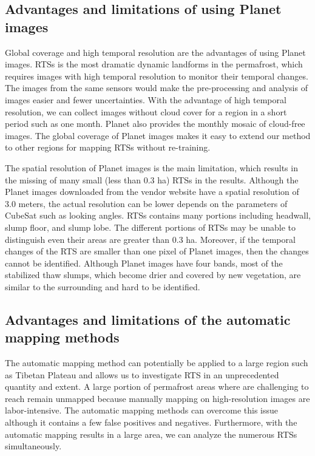 \documentclass[preprint,12pt,authoryear]{elsarticle}
\begin{document}
\subsection{Advantages and limitations of using Planet images}
\label{subsec_advantage_limitation_planet}

Global coverage and high temporal resolution are the advantages of using Planet images. RTSs is the most dramatic dynamic landforms in the permafrost, which requires images with high temporal resolution to monitor their temporal changes. The images from the same sensors would make the pre-processing and analysis of images easier and fewer uncertainties. With the advantage of high temporal resolution, we can collect images without cloud cover for a region in a short period such as one month. Planet also provides the monthly mosaic of cloud-free images. The global coverage of Planet images makes it easy to extend our method to other regions for mapping RTSs without re-training. 

The spatial resolution of Planet images is the main limitation, which results in the missing of many small (less than 0.3 ha) RTSs in the results. Although the Planet images downloaded from the vendor website have a spatial resolution of 3.0 meters, the actual resolution can be lower depends on the parameters of CubeSat such as looking angles. RTSs contains many portions including headwall, slump floor, and slump lobe. The different portions of RTSs may be unable to distinguish even their areas are greater than 0.3 ha. Moreover, if the temporal changes of the RTS are smaller than one pixel of Planet images, then the changes cannot be identified. Although Planet images have four bands, most of the stabilized thaw slumps, which become drier and covered by new vegetation, are similar to the surrounding and hard to be identified.

\subsection{Advantages and limitations of the automatic mapping methods}
\label{subsec_advantage_limitation_method}

The automatic mapping method can potentially be applied to a large region such as Tibetan Plateau and allows us to investigate RTS in an unprecedented quantity and extent. A large portion of permafrost areas where are challenging to reach remain unmapped because manually mapping on high-resolution images are labor-intensive. The automatic mapping methods can overcome this issue although it contains a few false positives and negatives. Furthermore, with the automatic mapping results in a large area, we can analyze the numerous RTSs simultaneously. 
\end{document}
